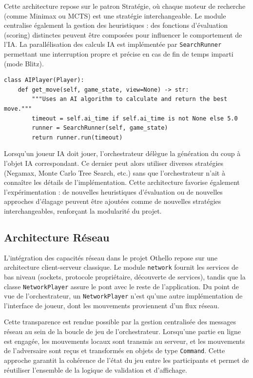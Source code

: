 \documentclass[a4paper]{article}
\begin{document}
Cette architecture repose sur le patron Stratégie, où chaque moteur de recherche (comme Minimax ou MCTS) est une stratégie interchangeable. Le module centralise également la gestion des heuristiques : des fonctions d'évaluation (scoring) distinctes peuvent être composées pour influencer le comportement de l'IA. La parallélisation des calculs IA est implémentée par \texttt{SearchRunner} permettant une interruption propre et précise en cas de fin de temps imparti (mode Blitz).

\begin{verbatim}
class AIPlayer(Player):
    def get_move(self, game_state, view=None) -> str:
        """Uses an AI algorithm to calculate and return the best move."""
        timeout = self.ai_time if self.ai_time is not None else 5.0
        runner = SearchRunner(self, game_state)
        return runner.run(timeout)
\end{verbatim}

Lorsqu'un joueur IA doit jouer, l'orchestrateur délègue la génération du coup à l'objet IA correspondant. Ce dernier peut alors utiliser diverses stratégies (Negamax, Monte Carlo Tree Search, etc.) sans que l'orchestrateur n'ait à connaître les détails de l'implémentation. Cette architecture favorise également l'expérimentation : de nouvelles heuristiques d'évaluation ou de nouvelles approches d'élagage peuvent être ajoutées comme de nouvelles stratégies interchangeables, renforçant la modularité du projet.

\subsection{Architecture Réseau}

L'intégration des capacités réseau dans le projet Othello repose sur une architecture client-serveur classique. Le module \texttt{network} fournit les services de bas niveau (sockets, protocole propriétaire, découverte de services), tandis que la classe \texttt{NetworkPlayer} assure le pont avec le reste de l'application. Du point de vue de l'orchestrateur, un \texttt{NetworkPlayer} n'est qu'une autre implémentation de l'interface de joueur, dont les mouvements proviennent d'un flux réseau.

Cette transparence est rendue possible par la gestion centralisée des messages réseau au sein de la boucle de jeu de l'orchestrateur. Lorsqu'une partie en ligne est engagée, les mouvements locaux sont transmis au serveur, et les mouvements de l'adversaire sont reçus et transformés en objets de type \texttt{Command}. Cette approche garantit la cohérence de l'état du jeu entre les participants et permet de réutiliser l'ensemble de la logique de validation et d'affichage.
\end{document}
